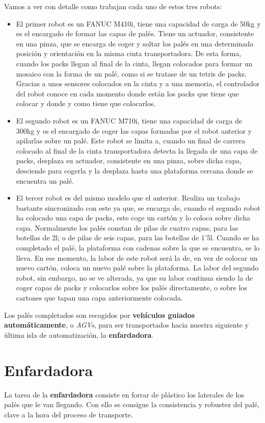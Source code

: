 \documentclass[11pt,a4paper,spanish,twoside]{report}
\begin{document}
Vamos a ver con detalle como trabajan cada uno de estos tres robots:
\begin{itemize}
\item El primer robot es un FANUC M410i, tiene una capacidad de carga de 50kg
y es el encargado de formar las capas de palés. Tiene un actuador, consistente
en una pinza, que se encarga de coger y soltar los palés en una determinada 
posición y orientación en la misma cinta transportadora. De esta forma, cuando 
los packs llegan al final de la cinta, llegan colocados para formar un mosaico 
con la forma de un palé, como si se tratase de un tetris de packs. Gracias a 
unos sensores colocados en la cinta y a una memoria, el controlador del robot 
conoce en cada momento donde están los packs que tiene que colocar y donde y 
como tiene que colocarlos.
\item El segundo robot es un FANUC M710i, tiene una capacidad de carga de 
300kg y es el encargado de coger las capas formadas por el robot anterior y
apilarlas sobre un palé. Este robot se limita a, cuando un final de carrera 
colocado al final de la cinta transportadora detecta la llegada de una capa 
de packs, desplaza su actuador, consistente en una pinza, sobre dicha capa,
desciende para cogerla y la desplaza hasta una plataforma cercana donde se 
encuentra un palé.
\item El tercer robot es del mismo modelo que el anterior. Realiza un trabajo
bastante sincronizado con este ya que, se encarga de, cuando el segundo robot
ha colocado una capa de packs, este coge un cartón y lo coloca sobre dicha
capa. Normalmente los palés constan de pilas de cuatro capas, para las 
botellas de 2l; o de pilas de seis capas, para las botellas de 1'5l. Cuando se
ha completado el palé, la plataforma con cadenas sobre la que se encuentra, se
lo lleva. En ese momento, la labor de este robot será la de, en vez de colocar
un nuevo cartón, coloca un nuevo palé sobre la plataforma. La labor del
segundo robot, sin embargo, no se ve alterada, ya que su labor continua siendo
la de coger capas de packs y colocarlos sobre los palés directamente, o sobre
los cartones que tapan una capa anteriormente colocada.
\end{itemize}

Los palés completados son recogidos por \textbf{vehículos guiados 
automáticamente}, o \emph{AGVs}, para ser transportados hacia nuestra siguiente
y última isla de automatización, la \textbf{enfardadora}.

\section{Enfardadora}
La tarea de la \textbf{enfardadora} consiste en forrar de plástico los 
laterales de los palés que le van llegando. Con ello se consigue la 
consistencia y robustez del palé, clave a la hora del proceso de transporte.
\end{document}
